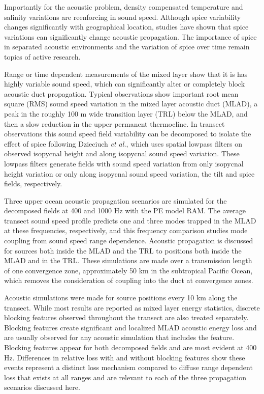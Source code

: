 \documentclass[preprint,NumberedRefs]{JASA}
\begin{document}
Importantly for the acoustic problem, density compensated temperature and salinity variations are reenforcing in sound speed. Although spice variability changes significantly with geographical location, studies have shown that spice variations can significantly change acoustic propagation\citep{colosi12,colosi13,murat2021}. The importance of spice in separated acoustic environments and the variation of spice over time remain topics of active research.

Range or time dependent measurements of the mixed layer show that it is has highly variable sound speed\citep{cole2010seasonal,rudnick1999compensation,klymak2015}, which can significantly alter or completely block acoustic duct propagation\citep{colosi2020observations,colosi21}. Typical observations show important root mean square (RMS) sound speed variation in the mixed layer acoustic duct (MLAD), a peak in the roughly 100 m wide transition layer (TRL) below the MLAD, and then a slow reduction in the upper permanent thermocline. In transect observations this sound speed field variability can be decomposed to isolate the effect of spice following Dzieciuch \emph{et al.}\citep{dzieciuch2004}, which uses spatial lowpass filters on observed isopycnal height and along isopycnal sound speed variation. These lowpass filters generate fields with sound speed variation from only isopycnal height variation or only along isopycnal sound speed variation, the tilt and spice fields, respectively.

Three upper ocean acoustic propagation scenarios are simulated for the decomposed fields at 400 and 1000 Hz with the PE model RAM\cite{collins93}. The average transect sound speed profile predicts one and three modes trapped in the MLAD at these frequencies, respectively, and this frequency comparison studies mode coupling from sound speed range dependence. Acoustic propagation is discussed for sources both inside the MLAD and the TRL to positions both inside the MLAD and in the TRL. These simulations are made over a transmission length of one convergence zone\citep{jensen2011computational}, approximately 50 km in the subtropical Pacific Ocean, which removes the consideration of coupling into the duct at convergence zones\citep{colosi2020observations}.

Acoustic simulations were made for source positions every 10 km along the transect. While most results are reported as mixed layer energy statistics, discrete blocking features\citep{colosi2020observations} observed throughout the transect are also treated separately. Blocking features create significant and localized MLAD acoustic energy loss and are usually observed for any acoustic simulation that includes the feature. Blocking features appear for both decomposed fields and are most evident at 400 Hz. Differences in relative loss with and without blocking features show these events represent a distinct loss mechanism compared to diffuse range dependent loss that exists at all ranges and are relevant to each of the three propagation scenarios discussed here.
\end{document}
